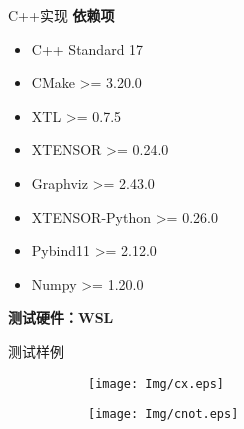 \documentclass[aspectratio=1610]{beamer}
\begin{document}
\begin{frame}{C++实现}
    \textbf{依赖项}
    \begin{itemize}
        \item C++ Standard 17
        \item CMake >= 3.20.0
        \item XTL >= 0.7.5
        \item XTENSOR >= 0.24.0
        \item Graphviz >= 2.43.0
        \item XTENSOR-Python >= 0.26.0
        \item Pybind11 >= 2.12.0
        \item Numpy >= 1.20.0
    \end{itemize} 
    \textbf{测试硬件：WSL}
\end{frame}
\begin{frame}{测试样例}
    \begin{figure}
        \centering
        \begin{subfigure}{0.4\textwidth}
            \centering
            \texttt{[image: Img/cx.eps]}
        \end{subfigure}
        \begin{subfigure}{0.4\textwidth}
            \centering
            \texttt{[image: Img/cnot.eps]}
        \end{subfigure}
    \end{figure}
\end{frame}
\end{document}
